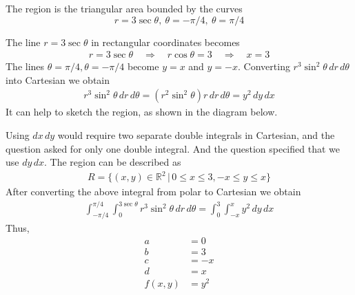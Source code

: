     {\color{DarkBlue}
    The region is the triangular area bounded by the curves
    $$r = 3\sec\theta, \ \theta  = - \pi/4 , \ \theta = \pi/4$$
    
    The line $r=3\sec\theta$ in rectangular coordinates becomes
    \begin{align}
        r=3\sec\theta \quad \Rightarrow \quad r\cos\theta = 3 \quad \Rightarrow \quad x = 3
    \end{align}
    The lines $\theta  = \pi/4 , \theta = -\pi/4$ become $y=x$ and $y=-x$.  Converting $r^3\sin^2\theta\, dr \, d\theta$ into Cartesian we obtain 
    \begin{align}
        r^3\sin^2\theta \, dr \, d\theta =  (r^2\sin^2\theta) r \, dr \, d\theta = y^2 \, dy\,dx
    \end{align}
    It can help to sketch the region, as shown in the diagram below. 
       \begin{center}     
    \end{center}           
    Using $dx \, dy$ would require two separate double integrals in Cartesian, and the question asked for only one double integral. And the question specified that we use $dy\,dx$. The region can be described as
    \begin{align}
        R = \{ (x,y) \in \mathbb R^2 \, | \, 0\le x \le 3, -x \le y \le x\}
    \end{align}
    After converting the above integral from polar to Cartesian we obtain 
    \begin{align}
        \int_{-\pi/4}^{\pi/4}\int_{0}^{3\sec\theta} r^3\sin^2\theta \, dr \, d\theta = \int_{0}^3 \int_{-x}^x y^2 \, dy \, dx
    \end{align} 
    Thus,
    \begin{align}
        a &= 0 \\
        b &= 3 \\
        c&= -x \\
        d&= x \\
        f(x,y) &= y^2
    \end{align}
    }
   \else

   \fi
    
\fi





